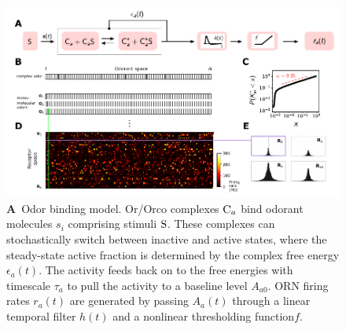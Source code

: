 \documentclass[9pt,twocolumn,twoside,lineno]{pnas-new}
\begin{document}

\begin{figure}[!tb]
	\centering
	\begin{subfigure}[t]{\linewidth}
		\label{fig:tuning_curves_a}
	\end{subfigure}
	\begin{subfigure}[t]{0\linewidth}
		\label{fig:tuning_curves_b}
	\end{subfigure}
	\begin{subfigure}[t]{0\linewidth}
		\label{fig:tuning_curves_c}
	\end{subfigure}
	\begin{subfigure}[t]{0\linewidth}
		\label{fig:tuning_curves_d}
	\end{subfigure}
	\begin{subfigure}[t]{0\linewidth}
		\label{fig:tuning_curves_e}
	\end{subfigure}
	\begin{subfigure}[t]{0\linewidth}
		\label{fig:tuning_curves_f}
	\end{subfigure}
	\includegraphics[width=\textwidth]{figures/1_tuning_curves}
	\caption{\footnotesize{
			\textbf{A}~Odor binding model. Or/Orco complexes $\textup{C}_a$ bind odorant molecules $s_i$ comprising stimuli $\textup{S}$. These complexes can stochastically switch between inactive and active states, where the steady-state active fraction is determined by the complex free energy $\epsilon_a(t)$. The activity feeds back on to the free energies with timescale $\tau_a$ to pull the activity to a baseline level $A_{a0}$. ORN firing rates $r_a(t)$ are generated by passing $A_a(t)$ through a linear temporal filter $h(t)$ and a nonlinear thresholding function$f$. 
}}
\end{figure}
\end{document}
